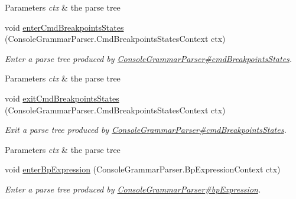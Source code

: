 \begin{DoxyCompactItemize}
\begin{DoxyCompactList}
\begin{DoxyParams}{Parameters}
{\em ctx} & the parse tree\\
\hline
\end{DoxyParams}
 \end{DoxyCompactList}\item 
void \hyperlink{classgov_1_1nasa_1_1jpf_1_1inspector_1_1client_1_1parser_1_1_console_grammar_base_listener_a54a280ba78858b9f2281e29996c5a43d}{enter\+Cmd\+Breakpoints\+States} (Console\+Grammar\+Parser.\+Cmd\+Breakpoints\+States\+Context ctx)
\begin{DoxyCompactList}\small\item\em Enter a parse tree produced by \hyperlink{classgov_1_1nasa_1_1jpf_1_1inspector_1_1client_1_1parser_1_1_console_grammar_parser_abd27b1db1328d8dcd4f5b25cd4db0407}{Console\+Grammar\+Parser\#cmd\+Breakpoints\+States}.


\begin{DoxyParams}{Parameters}
{\em ctx} & the parse tree\\
\hline
\end{DoxyParams}
 \end{DoxyCompactList}\item 
void \hyperlink{classgov_1_1nasa_1_1jpf_1_1inspector_1_1client_1_1parser_1_1_console_grammar_base_listener_a67e45c0bf6859476c2ce5b1b952490c0}{exit\+Cmd\+Breakpoints\+States} (Console\+Grammar\+Parser.\+Cmd\+Breakpoints\+States\+Context ctx)
\begin{DoxyCompactList}\small\item\em Exit a parse tree produced by \hyperlink{classgov_1_1nasa_1_1jpf_1_1inspector_1_1client_1_1parser_1_1_console_grammar_parser_abd27b1db1328d8dcd4f5b25cd4db0407}{Console\+Grammar\+Parser\#cmd\+Breakpoints\+States}.


\begin{DoxyParams}{Parameters}
{\em ctx} & the parse tree\\
\hline
\end{DoxyParams}
 \end{DoxyCompactList}\item 
void \hyperlink{classgov_1_1nasa_1_1jpf_1_1inspector_1_1client_1_1parser_1_1_console_grammar_base_listener_a07aa850ba790a7823e43d045bf42ac1e}{enter\+Bp\+Expression} (Console\+Grammar\+Parser.\+Bp\+Expression\+Context ctx)
\begin{DoxyCompactList}\small\item\em Enter a parse tree produced by \hyperlink{classgov_1_1nasa_1_1jpf_1_1inspector_1_1client_1_1parser_1_1_console_grammar_parser_af8f413ff85d64783d9625af4ca4b1f06}{Console\+Grammar\+Parser\#bp\+Expression}.



\end{DoxyCompactList}
\end{DoxyCompactItemize}
